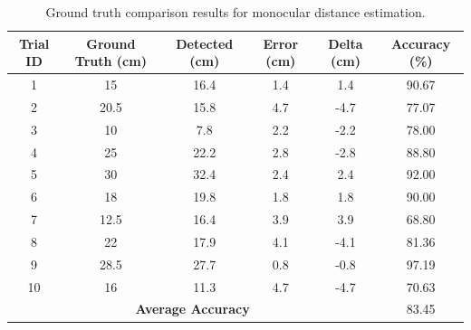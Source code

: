 \begin{table}[h!]
  \centering
  \begin{tabular}{|c|c|c|c|c|c|}
    \hline
    \textbf{Trial ID}                               & \textbf{Ground Truth (cm)} & \textbf{Detected (cm)} & \textbf{Error (cm)} & \textbf{Delta (cm)} & \textbf{Accuracy (\%)} \\
    \hline
    1                                               & 15                         & 16.4                   & 1.4                 & 1.4                 & 90.67                  \\
    2                                               & 20.5                       & 15.8                   & 4.7                 & -4.7                & 77.07                  \\
    3                                               & 10                         & 7.8                    & 2.2                 & -2.2                & 78.00                  \\
    4                                               & 25                         & 22.2                   & 2.8                 & -2.8                & 88.80                  \\
    5                                               & 30                         & 32.4                   & 2.4                 & 2.4                 & 92.00                  \\
    6                                               & 18                         & 19.8                   & 1.8                 & 1.8                 & 90.00                  \\
    7                                               & 12.5                       & 16.4                   & 3.9                 & 3.9                 & 68.80                  \\
    8                                               & 22                         & 17.9                   & 4.1                 & -4.1                & 81.36                  \\
    9                                               & 28.5                       & 27.7                   & 0.8                 & -0.8                & 97.19                  \\
    10                                              & 16                         & 11.3                   & 4.7                 & -4.7                & 70.63                  \\
    \hline
    \multicolumn{5}{|c|}{\textbf{Average Accuracy}} & 83.45                                                                                                                    \\
    \hline
  \end{tabular}
  \caption{Ground truth comparison results for monocular distance estimation.}
  \label{tab:distance-estimation}
\end{table}

